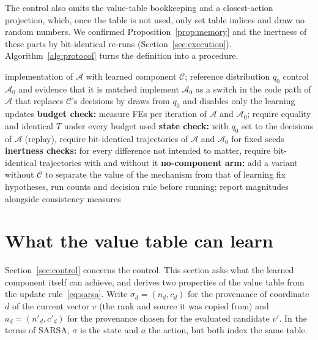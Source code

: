 The control also omits the value-table bookkeeping and a closest-action projection, which, once the table is not used, only
set table indices and draw no random numbers. We confirmed Proposition~\ref{prop:memory} and the inertness of these parts by
bit-identical re-runs (Section~\ref{sec:execution}). Algorithm~\ref{alg:protocol} turns the definition into a procedure.

\begin{algorithm}[!htbp]
\caption{Constructing and verifying a matched control for a learned component}
\label{alg:protocol}
\small
\begin{algorithmic}[1]
\Require implementation of $\mathcal A$ with learned component $\mathcal C$; reference distribution $q_0$
\Ensure control $\mathcal A_0$ and evidence that it is matched
\State implement $\mathcal A_0$ as a switch in the code path of $\mathcal A$ that replaces $\mathcal C$'s decisions by draws
  from $q_0$ and disables only the learning updates
\State \textbf{budget check:} measure FEs per iteration of $\mathcal A$ and $\mathcal A_0$; require equality and identical $T$
  under every budget used
\State \textbf{state check:} with $q_0$ set to the decisions of $\mathcal A$ (replay), require bit-identical trajectories of
  $\mathcal A$ and $\mathcal A_0$ for fixed seeds
\State \textbf{inertness checks:} for every difference not intended to matter, require bit-identical trajectories with and
  without it
\State \textbf{no-component arm:} add a variant without $\mathcal C$ to separate the value of the mechanism from that of learning
\State fix hypotheses, run counts and decision rule before running; report magnitudes alongside consistency measures
\end{algorithmic}
\end{algorithm}

\section{What the value table can learn}
\label{sec:theory}

Section~\ref{sec:control} concerns the control. This section asks what the learned component itself can achieve, and
derives two properties of the value table from the update rule~\eqref{eq:sarsa}. Write $\sigma_d=(n_d,c_d)$ for the
provenance of coordinate $d$ of the current vector $v$ (the rank and source it was copied from) and $a_d=(n'_d,c'_d)$ for
the provenance chosen for the evaluated candidate $v'$. In the terms of SARSA, $\sigma$ is the state and $a$ the action, but
both index the same table.

